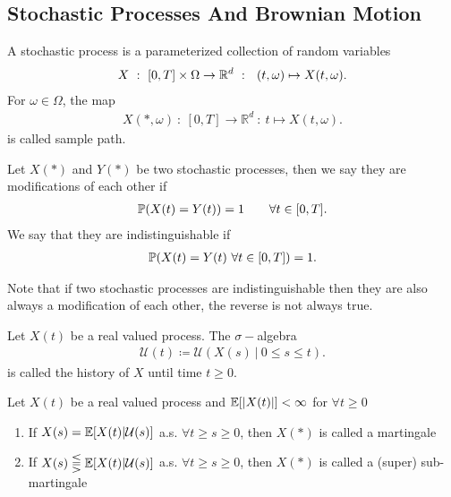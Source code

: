 \subsection{Stochastic Processes And Brownian Motion}
\begin{definition}
 A stochastic process is a parameterized collection of random variables 
 \begin{align*}
   X \ : \ [0,T] \times \Omega \rightarrow \R^d\ : \ \ (t,\omega ) \mapsto X(t,\omega )
 .\end{align*}
 For $  \omega  \in  \Omega $, the map 
 \begin{align*}
   X(*,\omega ) \ : \ [0,T] \to \mathbb{R}^{d}  \ : \ t \mapsto X(t,\omega )
 .\end{align*}
 is called sample path.
\end{definition}
\begin{definition}
 Let $X(*)$  and $Y(*)$ be two stochastic processes, then we say they are modifications of each other if 
 \begin{align*}
   \P(X(t) = Y(t))  = 1 \qquad \forall t \in [0,T] 
 .\end{align*}
 We say that they are indistinguishable if 
 \begin{align*}
   \P(X(t) = Y(t) \ \forall  t \in  [0,T])  = 1 
 .\end{align*}
\end{definition}
\begin{remark}
 Note that if two stochastic processes are indistinguishable then they are also always a modification of each other,
 the reverse is not always true.
\end{remark}
\begin{definition}[History]
 Let $X(t)$ be a real valued process. The $\sigma-$algebra 
 \begin{align*}
  \mathcal{U}(t) \coloneqq  \mathcal{U}(X(s) \ | \ 0\le s\le t)
 .\end{align*}
 is called the history of $X$ until time $t\ge 0$.
\end{definition}
\begin{definition}[Martingale]
  Let $X(t)$ be a real valued process and $\E[\abs{X(t)}] < \infty$  for $\forall t \ge 0$
  \begin{enumerate}
    \item If $X(s) = \E[X(t)|\mathcal{U}(s)]$ a.s. $\forall  t \ge  s \ge  0$,  then $X(*)$ is called a martingale
    \item If $X(s) \lesseqqgtr  \E[X(t)|\mathcal{U}(s)]$ a.s. $\forall  t \ge  s \ge  0$,  then $X(*)$ is called a (super) sub-martingale
  \end{enumerate}
\end{definition}
